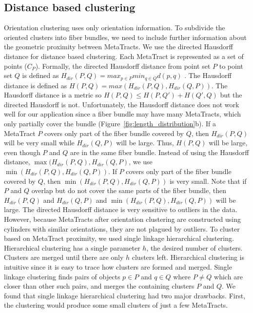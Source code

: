   
\subsection{Distance based clustering}
 \label{subsec:dist_clustering}
Orientation clustering uses only orientation information. To subdivide the oriented clusters into fiber bundles, we need to include further information about the geometric proximity between MetaTracts. We use the directed Hausdorff distance for distance based clustering.
Each MetaTract is represented as a set of points ($C_P$). Formally, the directed Hausdorff distance from point set $P$ to point set $Q$ is defined as 
$H_{dir}(P,Q) = max_{p \in P} min_{q \in Q} d(p,q)$ .
The Hausdorff distance is defined as $H(P,Q) = max(H_{dir}(P,Q),H_{dir}(Q,P))$.
The Hausdorff distance is a metric so $H(P,Q) \le H(P,Q') + H(Q',Q)$ but the directed Hausdorff is not.
%
Unfortunately, the Hausdorff distance does not work well for our application since a fiber bundle may have many MetaTracts, which only partially cover the bundle (Figure~\ref{fig:length_distribution}b). If a MetaTract $P$ covers only part of the fiber bundle covered by $Q$, then $H_{dir}(P,Q)$ will be very small while $H_{dir}(Q,P)$ will be large.
%
Thus, $H(P,Q)$ will be large, even though $P$ and $Q$ are in the same fiber bundle.
Instead of using the Hausdorff distance, $\max(H_{dir}(P,Q),H_{dir}(Q,P)$, we use $\min(H_{dir}(P,Q),H_{dir}(Q,P))$. If $P$ covers only part of the fiber bundle covered by $Q$, then $\min(H_{dir}(P,Q),H_{dir}(Q,P))$ is very small.
Note that if $P$ and $Q$ overlap but do not cover the same parts of the fiber bundle, then $H_{dir}(P,Q)$ and $H_{dir}(Q,P)$ and $\min(H_{dir}(P,Q),H_{dir}(Q,P))$ will be large.
% 
The directed Hausdorff distance is very sensitive to outliers in the data.
However, because MetaTracts after orientation clustering are constructed using cylinders with similar orientations, they are not plagued by outliers.
To cluster based on MetaTract proximity, we used single linkage hierarchical clustering.
Hierarchical clustering has a single parameter $h$, the desired number of clusters.
Clusters are merged until there are only $h$ clusters left.
Hierarchical clustering is intuitive since it is easy to trace how clusters are formed and merged.
Single linkage clustering finds pairs of objects $p \in P$ and $q \in Q$ where $P \neq Q$ which are closer than other such pairs, and merges the containing clusters $P$ and $Q$.
We found that single linkage hierarchical clustering had two major drawbacks.
First, the clustering would produce some small clusters of just a few MetaTracts.
